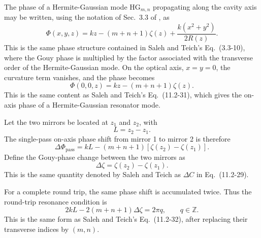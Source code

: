 \begin{resolucao}[Solution]
        The phase of a Hermite-Gaussian mode $\mathrm{HG}_{m,n}$ propagating along the cavity axis may be written, using the notation of Sec.~3.3 of , as
        \begin{equation}
            \Phi(x,y,z)
            =
            kz
            -
            (m+n+1)\zeta(z)
            +
            \frac{k(x^2+y^2)}{2R(z)}.
            \label{eq:total_phase}
        \end{equation}
        This is the same phase structure contained in Saleh and Teich's Eq.~(3.3-10), where the Gouy phase is multiplied by the factor associated with the transverse order of the Hermite-Gaussian mode. On the optical axis, $x=y=0$, the curvature term vanishes, and the phase becomes
        \begin{equation}
            \Phi(0,0,z)
            =
            kz
            -
            (m+n+1)\zeta(z).
            \label{eq:axis_phase_hg}
        \end{equation}
        This is the same content as Saleh and Teich's Eq.~(11.2-31), which gives the on-axis phase of a Hermite-Gaussian resonator mode.

        Let the two mirrors be located at $z_1$ and $z_2$, with
        \begin{equation}
            L=z_2-z_1.
        \end{equation}
        The single-pass on-axis phase shift from mirror 1 to mirror 2 is therefore
        \begin{equation}
            \Delta\Phi_{\mathrm{pass}}
            =
            kL
            -
            (m+n+1)
            \left[
                \zeta(z_2)-\zeta(z_1)
            \right].
            \label{eq:single_pass_phase}
        \end{equation}
        Define the Gouy-phase change between the two mirrors as
        \begin{equation}
            \Delta\zeta
            =
            \zeta(z_2)-\zeta(z_1).
            \label{eq:delta_zeta_definition}
        \end{equation}
        This is the same quantity denoted by Saleh and Teich as $\Delta C$ in Eq.~(11.2-29).

        For a complete round trip, the same phase shift is accumulated twice. Thus the round-trip resonance condition is
        \begin{equation}
            2kL
            -
            2(m+n+1)\Delta\zeta
            =
            2\pi q,
            \qquad
            q\in\mathbb{Z}.
            \label{eq:round_trip_condition}
        \end{equation}
        This is the same form as Saleh and Teich's Eq.~(11.2-32), after replacing their transverse indices by $(m,n)$.


\end{resolucao}
